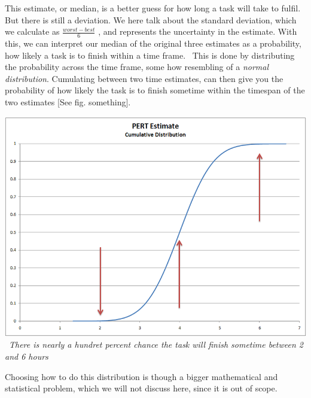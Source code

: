 This estimate, or median, is a better guess for how long a task will take to fulfil. But there is still a deviation. We here talk about the standard deviation, which we calculate as 
$\frac{worst-best}{6}$
, and represents the uncertainty in the estimate. With this, we can interpret our median of the original three estimates as a probability, how likely a task is to finish within a time frame. \
This is done by distributing the probability across the time frame, some how resembling of a \textit{normal distribution}. Cumulating between two time estimates, can then give you the probability of how likely the task is to finish sometime within the timespan of the two estimates [See fig. something]. \
\begin{center}
\includegraphics[scale=0.5]{PERTDistribution.png} 
\
\textit{There is nearly a hundret percent chance the task will finish sometime between 2 and 6 hours}
\end{center}

Choosing how to do this distribution is though a bigger mathematical and statistical problem, which we will not discuss here, since it is out of scope.

